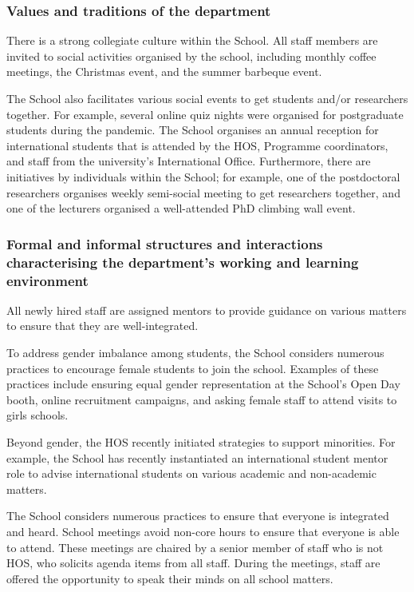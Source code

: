 \subsubsection{Values and traditions of the department}
There is a strong collegiate culture within the School. 
All staff members are invited to social activities organised by the school, including monthly coffee meetings, the Christmas event, and the summer barbeque event. 

The School also facilitates various social events to get students and/or researchers together. For example, several online quiz nights were organised for postgraduate students during the pandemic. The School organises an annual reception for international students that is attended by the \ac{HOS}, Programme coordinators, and staff from the university's International Office. Furthermore, there are initiatives by individuals within the School; for example, one of the postdoctoral researchers organises weekly semi-social meeting to get researchers together, and one of the lecturers organised a well-attended PhD climbing wall event.

\subsubsection{Formal and informal structures and interactions characterising the department's working and learning environment}

All newly hired staff are assigned mentors to provide guidance on various matters to ensure that they are well-integrated.

To address gender imbalance among students, the School considers numerous practices to encourage female students to join the school. Examples of these practices include ensuring equal gender representation at the School's Open Day booth, online recruitment campaigns, and asking female staff to attend visits to girls schools.

Beyond gender, the \ac{HOS} recently initiated strategies to support minorities. For example, the School has recently instantiated an international student mentor role to advise international students on various academic and non-academic matters. 

The School considers numerous practices to ensure that everyone is integrated and heard. School meetings avoid non-core hours to ensure that everyone is able to attend. 
These meetings are chaired by a senior member of staff who is not \ac{HOS}, who solicits agenda items from all staff. 
During the meetings, staff are offered the opportunity to speak their minds on all school matters. 


